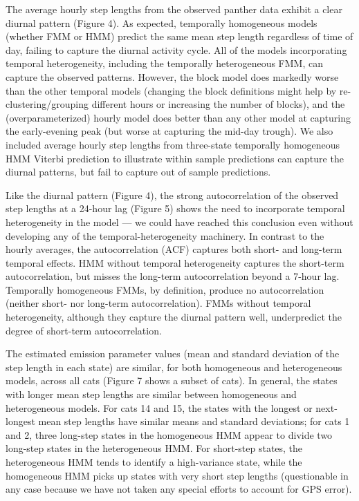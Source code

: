 \documentclass{bmcart}
\begin{document}
The average hourly step lengths from the observed panther data exhibit a clear diurnal pattern (Figure 4). As expected, temporally homogeneous models (whether FMM or HMM) predict the same mean step length regardless of time of day, failing to capture the diurnal activity cycle. All of the models incorporating temporal heterogeneity, including the temporally heterogeneous FMM, can capture the observed patterns. However, the block model does markedly worse than the other temporal models (changing the block definitions might help by re-clustering/grouping different hours or increasing the number of blocks), and the (overparameterized) hourly model does better than any other model at capturing the early-evening peak (but worse at capturing the mid-day trough). We also included average hourly step lengths from three-state temporally homogeneous HMM Viterbi prediction to illustrate within sample predictions can capture the diurnal patterns, but fail to capture out of sample predictions.

Like the diurnal pattern (Figure 4),
the strong autocorrelation of the observed step lengths at a 24-hour lag (Figure 5) shows the need to incorporate temporal heterogeneity in the model --- we could have reached this conclusion even without developing any of the temporal-heterogeneity machinery.
In contrast to the hourly averages, the autocorrelation (ACF) captures both short- and long-term temporal effects. HMM without temporal heterogeneity captures the short-term autocorrelation, but misses the long-term autocorrelation beyond a 7-hour lag.
Temporally homogeneous FMMs, by definition, produce no autocorrelation (neither short- nor long-term autocorrelation). FMMs without temporal heterogeneity, although they capture the diurnal pattern well, underpredict the degree of short-term autocorrelation.


The estimated emission parameter values
(mean and standard deviation of the step length in each state)
are similar, for both homogeneous and heterogeneous
models, across all cats (Figure 7 shows a subset of cats). 
In general, the states with longer mean step lengths are
similar between homogeneous and heterogeneous models. For cats 14 and 15, the states with
the longest or next-longest mean step lengths have similar means
and standard deviations; for cats 1 and 2, three long-step states
in the homogeneous HMM appear to divide two long-step states in 
the heterogeneous HMM. For short-step states, the heterogeneous HMM
tends to identify a high-variance state, while the homogeneous HMM
picks up states with very short step lengths (questionable in any
case because we have not taken any special efforts to account for
GPS error).
\end{document}
